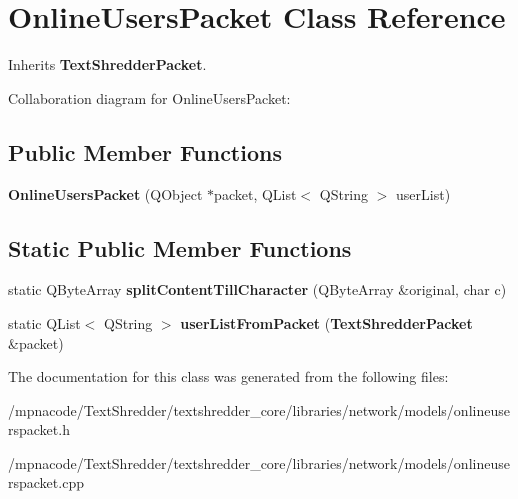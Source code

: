 \section{OnlineUsersPacket Class Reference}
\label{class_online_users_packet}


Inherits {\bf TextShredderPacket}.



Collaboration diagram for OnlineUsersPacket:
\subsection*{Public Member Functions}
\begin{DoxyCompactItemize}
\item 
{\bfseries OnlineUsersPacket} (QObject $\ast$packet, QList$<$ QString $>$ userList)\label{class_online_users_packet_aa13dd8da86da4958e3419e98557abf4a}

\end{DoxyCompactItemize}
\subsection*{Static Public Member Functions}
\begin{DoxyCompactItemize}
\item 
static QByteArray {\bfseries splitContentTillCharacter} (QByteArray \&original, char c)\label{class_online_users_packet_ae472bb14481674fa03faec9999b917c6}

\item 
static QList$<$ QString $>$ {\bfseries userListFromPacket} ({\bf TextShredderPacket} \&packet)\label{class_online_users_packet_a64ea4fdf646bc60af3eaac29bcd73f8d}

\end{DoxyCompactItemize}


The documentation for this class was generated from the following files:\begin{DoxyCompactItemize}
\item 
/mpnacode/TextShredder/textshredder\_\-core/libraries/network/models/onlineuserspacket.h\item 
/mpnacode/TextShredder/textshredder\_\-core/libraries/network/models/onlineuserspacket.cpp\end{DoxyCompactItemize}
